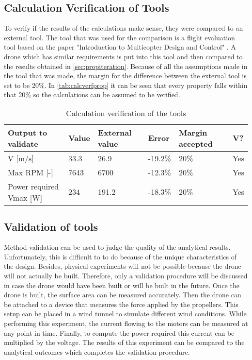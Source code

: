 \subsection{Calculation Verification of Tools}
\label{sub:calverprop}

To verify if the results of the calculations make sense, they were compared to an external tool. The tool that was used for the comparison is a flight evaluation tool based on the paper "Introduction to Multicopter Design and Control" \cite{Vovasmulticopterdesign}. A drone which has similar requirements is put into this tool and then compared to the results obtained in \autoref{sec:propiteration}. Because of all the assumptions made in the tool that was made, the margin for the difference between the external tool is set to be 20\%. In \autoref{tab:calcverfprop} it can be seen that every property falls within that 20\% so the calculations can be assumed to be verified. 

\begin{table}[h]
\centering
\caption{Calculation verification of the tools}
\label{tab:calcverfprop}
\begin{tabular}{|l|l|l|l|l|l|}
\hline
\textbf{Output   to validate} & \textbf{Value} & \textbf{External value} & \textbf{Error} & \textbf{Margin accepted} & \textbf{V?}                 \\ \hline
V {[}m/s{]}                   & 33.3           & 26.9                    & -19.2\%        & 20\%                     & \cellcolor[HTML]{C1FFC1}Yes \\ \hline
Max RPM {[}-{]}               & 7643           & 6700                    & -12.3\%        & 20\%                     & \cellcolor[HTML]{C1FFC1}Yes \\ \hline
Power required Vmax {[}W{]}   & 234            & 191.2                   & -18.3\%        & 20\%                     & \cellcolor[HTML]{C1FFC1}Yes \\ \hline
\end{tabular}
\end{table}

\subsection{Validation of tools}

Method validation can be used to judge the quality of the analytical results. Unfortunately, this is difficult to to do because of the unique characteristics of the design. Besides, physical experiments will not be possible because the drone will not actually be built. Therefore, only a validation procedure will be discussed in case the drone would have been built or will be built in the future. Once the drone is built, the surface area can be measured accurately. Then the drone can be attached to a device that measures the force applied by the propellers. This setup can be placed in a wind tunnel to simulate different wind conditions. While performing this experiment, the current flowing to the motors can be measured at any point in time. Finally, to compute the power required this current can be multiplied by the voltage. The results of this experiment can be compared to the analytical outcomes which completes the validation procedure.

